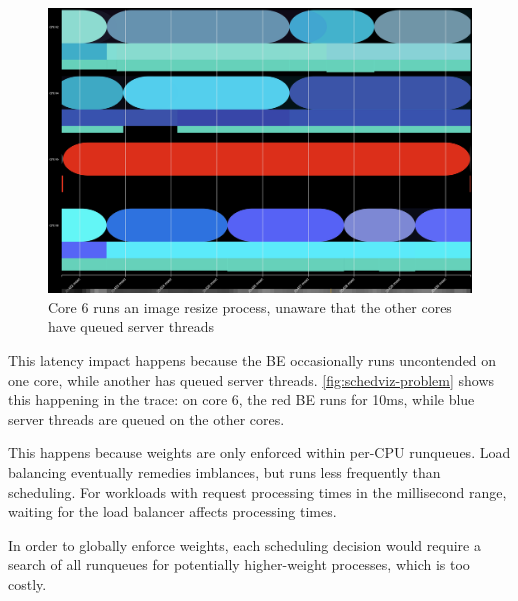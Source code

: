 \begin{figure}[t]
    \centering
    \includegraphics[width=\columnwidth]{graphs/schedviz-problem.png}
    \caption{Core 6 runs an image resize process, unaware that the other cores
    have queued server threads}\label{fig:schedviz-problem}
\end{figure}

This latency impact happens because the BE occasionally runs uncontended on one
core, while another has queued server threads. \autoref{fig:schedviz-problem}
shows this happening in the trace: on core 6, the red BE runs for 10ms, while
blue server threads are queued on the other cores.

This happens because weights are only enforced within per-CPU runqueues. Load
balancing eventually remedies imblances, but runs less frequently than
scheduling. For workloads with request processing times in the millisecond
range, waiting for the load balancer affects processing times.

In order to globally enforce weights, each scheduling decision would require a
search of all runqueues for potentially higher-weight processes, which is too
costly. 




